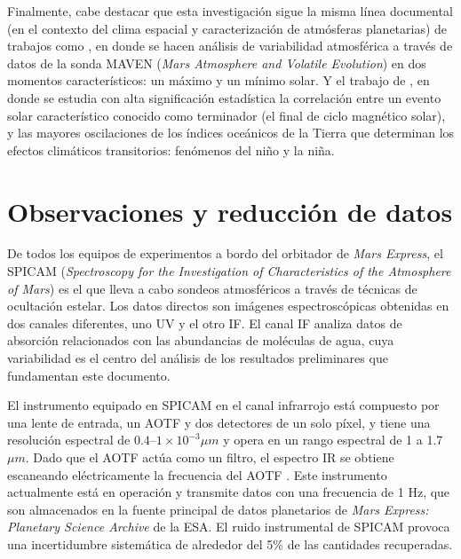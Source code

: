 \documentclass[a4paper,alpha-refs]{eSpectra}
\begin{document}
Finalmente, cabe destacar que esta investigaci\'on sigue la misma l\'inea documental (en el contexto del clima espacial y caracterizaci\'on de atm\'osferas planetarias) de trabajos como \cite{kamsali_2021}, en donde se hacen an\'alisis de variabilidad atmosf\'erica a trav\'es de datos de la sonda MAVEN (\textit{Mars Atmosphere and Volatile Evolution}) en dos momentos caracter\'isticos: un máximo y un mínimo solar. Y el trabajo de \cite{Lemon_2018}, en donde se estudia con alta significaci\'on estadística la correlaci\'on entre un evento solar caracter\'istico conocido como terminador (el final de ciclo magn\'etico solar), y las mayores oscilaciones de los \'indices oce\'anicos de la Tierra que determinan los efectos clim\'aticos transitorios: fen\'omenos del ni\~no y la ni\~na.

\section{Observaciones y reducción de datos}

De todos los equipos de experimentos a bordo del orbitador de \textit{Mars Express}, el SPICAM (\textit{Spectroscopy for the Investigation of Characteristics of the Atmosphere of Mars}) es el que lleva a cabo sondeos atmosf\'ericos a trav\'es de t\'ecnicas de ocultaci\'on estelar. Los datos directos son im\'agenes espectrosc\'opicas obtenidas en dos canales diferentes, uno UV y el otro IF. El canal IF analiza datos de absorci\'on relacionados con las abundancias de mol\'eculas de agua, cuya variabilidad es el centro del an\'alisis de los resultados preliminares que fundamentan este documento.

El instrumento equipado en SPICAM en el canal infrarrojo est\'a compuesto por una lente de entrada, un AOTF y dos detectores de un solo p\'ixel, y tiene una resoluci\'on espectral de  $0.4–1\times10^{-3} \mu m $ y opera en un rango espectral de 1 a 1.7 $\mu m$. Dado que el AOTF act\'ua como un filtro, el espectro IR se obtiene escaneando el\'ectricamente la frecuencia del AOTF \citep{fedorova_2009_IR_H2O}. Este instrumento actualmente est\'a en operaci\'on y transmite datos con una frecuencia de 1 Hz, que son almacenados en la fuente principal de datos planetarios de \textit{Mars Express: Planetary Science Archive} de la ESA. El ruido instrumental de SPICAM provoca una incertidumbre sistem\'atica de alrededor del 5\% de las cantidades recuperadas.
\end{document}
